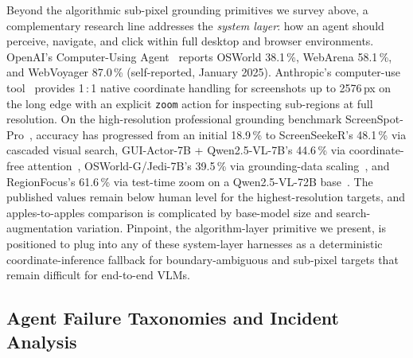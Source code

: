 \documentclass[sigconf,nonacm]{acmart}
\begin{document}
Beyond the algorithmic sub-pixel grounding primitives we
survey above, a complementary research line addresses
the \emph{system layer}: how an agent should perceive,
navigate, and click within full desktop and browser
environments.  OpenAI's Computer-Using
Agent~\cite{openai2025cua} reports OSWorld 38.1\,\%,
WebArena 58.1\,\%, and WebVoyager 87.0\,\%
(self-reported, January 2025).  Anthropic's
computer-use tool~\cite{anthropic2026computeruse}
provides 1\,:\,1 native coordinate handling for
screenshots up to 2576\,px on the long edge with an
explicit \texttt{zoom} action for inspecting
sub-regions at full resolution.  On the
high-resolution professional grounding benchmark
ScreenSpot-Pro~\cite{li2025screenspotpro}, accuracy
has progressed from an initial 18.9\,\% to
ScreenSeekeR's 48.1\,\% via cascaded visual search,
GUI-Actor-7B + Qwen2.5-VL-7B's 44.6\,\% via
coordinate-free attention~\cite{guiactor},
OSWorld-G/Jedi-7B's 39.5\,\% via grounding-data
scaling~\cite{xie2025jedi}, and RegionFocus's
61.6\,\% via test-time zoom on a Qwen2.5-VL-72B
base~\cite{regionfocus}.  The published values remain
below human level for the highest-resolution
targets, and apples-to-apples comparison is
complicated by base-model size and search-augmentation
variation.  Pinpoint, the algorithm-layer primitive
we present, is positioned to plug into any of these
system-layer harnesses as a deterministic
coordinate-inference fallback for boundary-ambiguous
and sub-pixel targets that remain difficult for
end-to-end VLMs.

\subsection{Agent Failure Taxonomies and Incident Analysis}
\label{sec:agent-failure-taxonomies}
\end{document}
